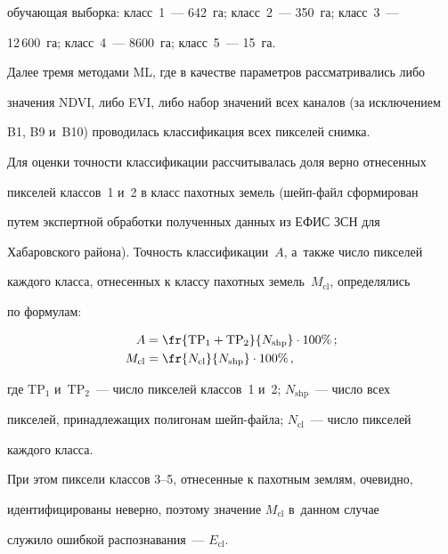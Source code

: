 обучающая выборка: класс~1~--- 642~га; класс~2~--- 350~га; класс~3~--- 

12\,600~га; класс~4~--- 8600~га; класс~5~--- 15~га. 

  

  Далее тремя методами ML, где в качестве параметров рассматривались либо 

значения NDVI, либо EVI, либо набор значений всех каналов (за исключением 

B1, B9 и~B10) проводилась классификация всех пикселей снимка.

  

  Для оценки точности классификации рассчитывалась доля верно отнесенных 

пикселей классов~1 и~2 в класс пахотных земель (шейп-файл сформирован 

путем экспертной обработки полученных данных из ЕФИС ЗСН для 

Хабаровского района). Точность классификации~$A$, а~также число пикселей 

каждого класса, отнесенных к классу пахотных земель~$M_{\mathrm{cl}}$, определялись 

по формулам: 

  \begin{align*}

  A &= \fr{\mathrm{TP}_1+\mathrm{TP}_2}{N_{\mathrm{shp}}} \cdot 100\%\,;


  \\

  M_{\mathrm{cl}}&= \fr{N_{\mathrm{cl}}}{N_{\mathrm{shp}}}\cdot 100\%\,,


  \end{align*}

где $\mathrm{TP}_1$ и~$\mathrm{TP}_2$~--- число пикселей классов~1 и~2; $N_{\mathrm{shp}}$~--- число всех 

пикселей, принадлежащих полигонам шейп-фай\-ла; $N_{\mathrm{cl}}$~--- число пикселей 

каждого класса.


  При этом пиксели классов 3--5, отнесенные к пахотным землям, очевидно, 

идентифицированы неверно, поэтому значение $M_{\mathrm{cl}}$ в~данном случае 

служило ошибкой распознавания~--- $E_{\mathrm{cl}}$.



